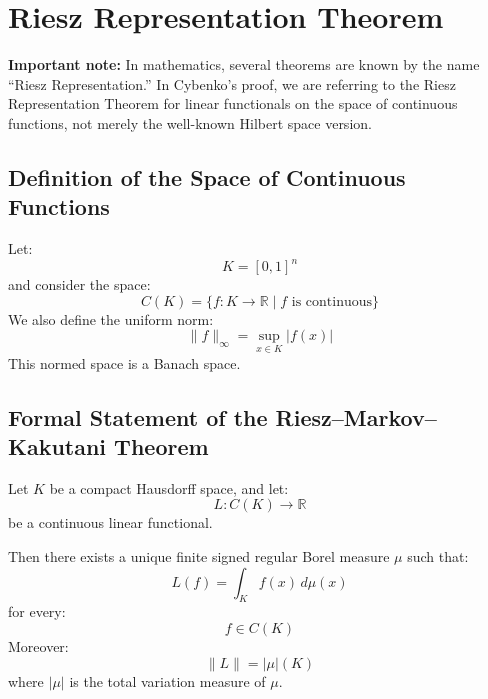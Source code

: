 \documentclass{article}
\begin{document}
\section*{Riesz Representation Theorem}

\textbf{Important note:} In mathematics, several theorems are known by the name ``Riesz Representation.'' In Cybenko's proof, we are referring to the Riesz Representation Theorem for linear functionals on the space of continuous functions, not merely the well-known Hilbert space version.

\subsection*{Definition of the Space of Continuous Functions}

Let:
\[
K = [0,1]^n
\]
and consider the space:
\[
C(K) = \{ f : K \to \mathbb{R} \mid f \text{ is continuous} \}
\]
We also define the uniform norm:
\[
\| f \|_\infty = \sup_{x \in K} | f(x) |
\]
This normed space is a Banach space.

\subsection*{Formal Statement of the Riesz--Markov--Kakutani Theorem}

Let \( K \) be a compact Hausdorff space, and let:
\[
L : C(K) \to \mathbb{R}
\]
be a continuous linear functional.

Then there exists a unique finite signed regular Borel measure \( \mu \) such that:
\[
L(f) = \int_K f(x) \, d\mu(x)
\]
for every:
\[
f \in C(K)
\]
Moreover:
\[
\| L \| = |\mu|(K)
\]
where \( |\mu| \) is the total variation measure of \( \mu \).
\end{document}
